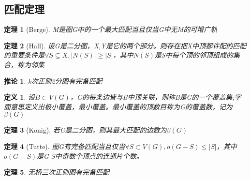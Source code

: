 \documentclass[UTF8]{ctexart}
\newtheorem{dfnt}{定义}
\newtheorem{thr}{定理}
\newtheorem*{coro}{推论}
\begin{document}
\subsection{匹配定理}
\begin{thr}[Berge]
M是图G中的一个最大匹配当且仅当G中无M的可增广轨
\end{thr}
\begin{thr}[Hall]
设G是二分图，X,Y是它的两个部分。则存在把X中顶都许配的匹配的重要条件是$\forall S \subseteq X,|N(S)|\geq |S|$，其中$N(S)$是S中每个顶的邻顶组成的集合，称为邻集
\end{thr}
\begin{coro}
k次正则2分图有完备匹配
\end{coro}
\begin{dfnt}
设$B \subset V(G)$，G的每条边皆与B中顶关联，则称B是G的一个覆盖集;字面意思定义出极小覆盖，最小覆盖。最小覆盖的顶数目称为G的覆盖数，记为$\beta (G)$
\end{dfnt}
\begin{thr}[Konig]
若G是二分图，则其最大匹配的边数为$\beta (G)$
\end{thr}
\begin{thr}[Tutte]
图G有完备匹配当且仅当$\forall S \subset V(G),o(G-S) \leq |S|$，其中$o(G-S)$是G-S中奇数个顶点的连通片个数。
\end{thr}
\begin{thr}
无桥三次正则图有完备匹配
\end{thr}
\end{document}

